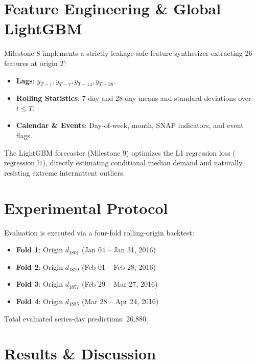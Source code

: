 \documentclass[conference]{IEEEtran}
\begin{document}
\section{Feature Engineering \& Global LightGBM}
Milestone 8 implements a strictly leakage-safe feature synthesizer extracting 26 features at origin $T$:
\begin{itemize}
    \item \textbf{Lags}: $y_{T-1}, y_{T-7}, y_{T-14}, y_{T-28}$.
    \item \textbf{Rolling Statistics}: 7-day and 28-day means and standard deviations over $t \le T$.
    \item \textbf{Calendar \& Events}: Day-of-week, month, SNAP indicators, and event flags.
\end{itemize}
The LightGBM forecaster (Milestone 9) optimizes the L1 regression loss ($\text{regression\_l1}$), directly estimating conditional median demand and naturally resisting extreme intermittent outliers.

\section{Experimental Protocol}
Evaluation is executed via a four-fold rolling-origin backtest:
\begin{itemize}
    \item \textbf{Fold 1}: Origin $d_{1801}$ (Jan 04 – Jan 31, 2016)
    \item \textbf{Fold 2}: Origin $d_{1829}$ (Feb 01 – Feb 28, 2016)
    \item \textbf{Fold 3}: Origin $d_{1857}$ (Feb 29 – Mar 27, 2016)
    \item \textbf{Fold 4}: Origin $d_{1885}$ (Mar 28 – Apr 24, 2016)
\end{itemize}
Total evaluated series-day predictions: 26,880.

\section{Results \& Discussion}
\end{document}
